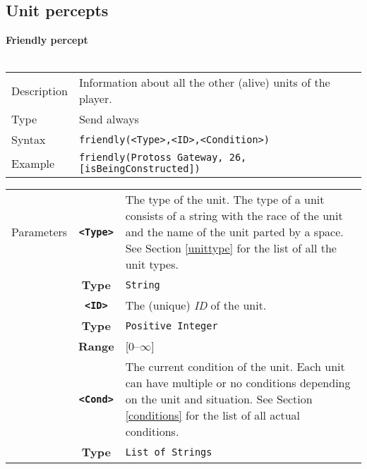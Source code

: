 \subsection{Unit percepts}
\noindent
\textbf{Friendly percept}\\
\\
\begin{tabularx}{\textwidth}{lX}
 Description & Information about all the other (alive) units of the player. \\
 Type & Send always \\
 Syntax & \verb|friendly(<Type>,<ID>,<Condition>)| \\
 Example & \verb|friendly(Protoss Gateway, 26, [isBeingConstructed])| \\
 \end{tabularx}
 \begin{tabularx}{\textwidth}{l | c | p{8cm}|}
 \cline{2-3}
 Parameters
            & \textbf{\verb|<Type>|} & The type of the unit. The type of a unit consists of a string with the race of the unit and the name of the unit parted by a space. See Section \ref{unittype} for the list of all the unit types. \\
            & \textbf{Type} & \verb|String| \\
            \cline{2-3}
            & \textbf{\verb|<ID>|} & The (unique) \textit{ID} of the unit.\\
            & \textbf{Type} & \verb|Positive Integer| \\
            & \textbf{Range} & [0--$\infty$] \\
            \cline{2-3}
            & \textbf{\verb|<Cond>|} & The current condition of the unit. Each unit can have multiple or no conditions depending on the unit and situation. See Section \ref{conditions} for the list of all actual conditions.\\
            & \textbf{Type} & \verb|List of Strings| \\
            \cline{2-3}
\end{tabularx}\\
\newpage
\noindent

